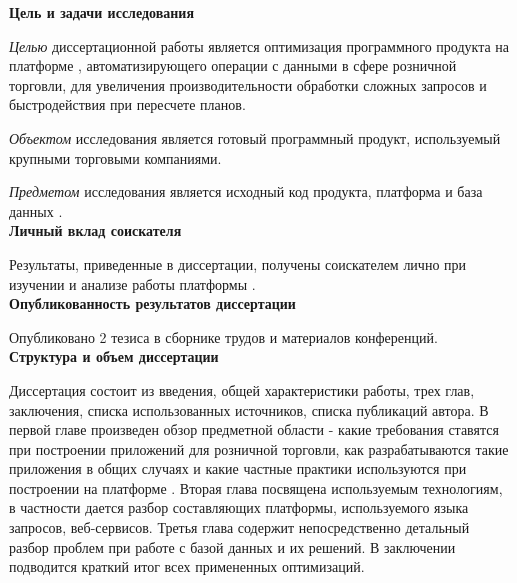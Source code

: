 
\textbf{Цель и задачи исследования}

\emph{Целью} диссертационной работы является  оптимизация программного продукта на платформе \LB, автоматизирующего операции с данными в сфере розничной торговли, для увеличения производительности обработки сложных запросов и быстродействия при пересчете планов.

\emph{Объектом} исследования является готовый программный продукт, используемый крупными торговыми компаниями.

\emph{Предметом} исследования является исходный код продукта, платформа и база данных \LB.\\



\textbf{Личный вклад соискателя}

Результаты, приведенные в диссертации, получены соискателем лично при изучении и анализе работы платформы \LB.\\


\textbf{Опубликованность результатов диссертации}

Опубликовано 2 тезиса в сборнике трудов и материалов конференций.\\

\textbf{Структура и объем диссертации}

Диссертация состоит из введения, общей характеристики работы, трех глав, заключения, списка использованных источников, списка публикаций автора. В первой главе произведен обзор предметной области - какие требования ставятся при построении приложений для розничной торговли, как разрабатываются такие приложения в общих случаях и какие частные практики используются при построении на платформе \LB. Вторая глава посвящена используемым технологиям, в частности дается разбор составляющих платформы, используемого языка запросов, веб-сервисов. Третья глава содержит непосредственно детальный разбор проблем при работе с базой данных и их решений. В заключении подводится краткий итог всех примененных оптимизаций.


